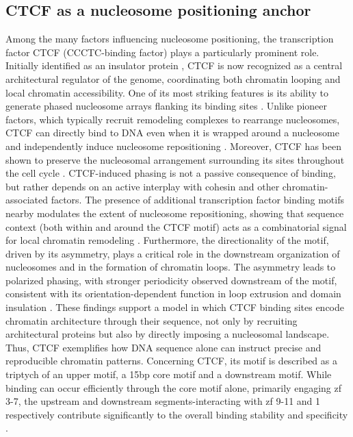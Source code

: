 \documentclass[11pt]{book}
\begin{document}
\subsection{CTCF as a nucleosome positioning anchor}
Among the many factors influencing nucleosome positioning, the transcription factor CTCF (CCCTC-binding factor) plays a particularly prominent role. Initially identified as an insulator protein \cite{rao_3d_2014}, CTCF is now recognized as a central architectural regulator of the genome, coordinating both chromatin looping and local chromatin accessibility. One of its most striking features is its ability to generate phased nucleosome arrays flanking its binding sites \cite{teif_genome-wide_2012, owens_ctcf_2019}. Unlike pioneer factors, which typically recruit remodeling complexes to rearrange nucleosomes, CTCF can directly bind to DNA even when it is wrapped around a nucleosome and independently induce nucleosome repositioning \cite{grand_genome_2024}. Moreover, CTCF has been shown to preserve the nucleosomal arrangement surrounding its sites throughout the cell cycle \cite{owens_ctcf_2019}.
CTCF-induced phasing is not a passive consequence of binding, but rather depends on an active interplay with cohesin and other chromatin-associated factors. The presence of additional transcription factor binding motifs nearby modulates the extent of nucleosome repositioning, showing that sequence context (both within and around the CTCF motif) acts as a combinatorial signal for local chromatin remodeling \cite{grand_genome_2024, do_binding_2025}. Furthermore, the directionality of the motif, driven by its asymmetry, plays a critical role in the downstream organization of nucleosomes and in the formation of chromatin loops. The asymmetry leads to polarized phasing, with stronger periodicity observed downstream of the motif, consistent with its orientation-dependent function in loop extrusion and domain insulation \cite{rao_3d_2014,nichols_ctcf_2015,guo_crispr_2015}. These findings support a model in which CTCF binding sites encode chromatin architecture through their sequence, not only by recruiting architectural proteins but also by directly imposing a nucleosomal landscape. Thus, CTCF exemplifies how DNA sequence alone can instruct precise and reproducible chromatin patterns.
Concerning CTCF, its motif is described as a triptych of an upper motif, a 15bp core motif and a downstream motif. While binding can occur efficiently through the core motif alone, primarily engaging \gls{zf} 3-7, the upstream and downstream segments-interacting with \gls{zf} 9-11 and 1 respectively contribute significantly to the overall binding stability and specificity \cite{yang_structures_2023}.
\end{document}
